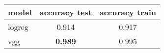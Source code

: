 \begin{tabular}{|l | c | c|}
  \hline
  model & accuracy test & accuracy train\\
  \hline
  logreg & 0.914 & 0.917 \\
  \hline
  vgg & \textbf{0.989} & 0.995 \\
  \hline
\end{tabular}